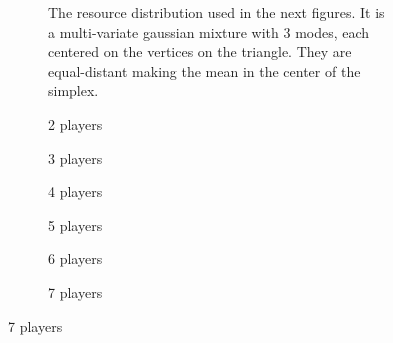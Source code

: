 \documentclass{article}
\begin{document}
     
    \begin{figure}[ht!] 
            \centering
            \begin{subfigure}[b]{0.6\linewidth}
                \centering
                
                \caption{The resource distribution used in the next figures. It is a multi-variate gaussian mixture with 3 modes, each centered on the vertices on the triangle. They are equal-distant making the mean in the center of the simplex.}
                \label{fig8:a}
            \end{subfigure}
            
            \begin{subfigure}[b]{0.3\linewidth}
                \centering
                 
                \caption{2 players} 
                \label{fig8:b} 
                \vspace{4ex}
            \end{subfigure}%
            \begin{subfigure}[b]{0.3\linewidth}
                \centering
                 
                \caption{3 players} 
                \label{fig8:c} 
                \vspace{4ex}
            \end{subfigure} 
            \begin{subfigure}[b]{0.3\linewidth}
                \centering
                 
                \caption{4 players} 
                \label{fig8:d}
                \vspace{4ex}
            \end{subfigure}%
            
            
            \begin{subfigure}[b]{0.3\linewidth}
                \centering
                
                \caption{5 players }  
                \label{fig8:e} 
                \vspace{4ex}
            \end{subfigure}
            \begin{subfigure}[b]{0.3\linewidth}
                \centering
                
                \caption{6 players} 
                \label{fig8:f} 
                \vspace{4ex}
            \end{subfigure}
            \begin{subfigure}[b]{0.3\linewidth}
                \centering
                
                \caption{7 players } 
                \label{fig8:g}
                \vspace{4ex}
            \end{subfigure} 


\end{figure}
\end{document}
